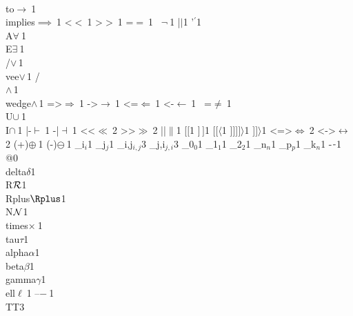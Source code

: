 {{{        {\\to}{{$\to\ $}}1
        {\\implies}{{$\implies\ $}}1
        {<}{{$<\ $}}1
        {>}{{$>\ $}}1
        {=}{{$=\ $}}1
        {~}{{$\neg\ $}}1
        {|}{{$\mid$}}1
        {'}{{$^\prime$}}1
        {\\A}{{$\forall\ $}}1
        {\\E}{{$\exists\ $}}1
        {\\/}{{$\vee\,$}}1
        {\\vee}{{$\vee\,$}}1
        {/\\}{{$\wedge\,$}}1
        {\\wedge}{{$\wedge\,$}}1
        {=>}{{$\Rightarrow\ $}}1
        {->}{{$\rightarrow\ $}}1
        {<=}{{$\Leftarrow\ $}}1
        {<-}{{$\leftarrow\ $}}1
        {~=}{{$\neq\ $}}1
        {\\U}{{$\cup\ $}}1
        {\\I}{{$\cap\ $}}1
        {|-}{{$\vdash\ $}}1
        {-|}{{$\dashv\ $}}1
        {<<}{{$\ll\ $}}2
        {>>}{{$\gg\ $}}2
        {||}{{$\|$}}1
        {[}{{$[$}}1
        {]}{{$\,]$}}1
        {[[}{{$\langle$}}1
        {]]]}{{$]\rangle$}}1
        {]]}{{$\rangle$}}1
        {<=>}{{$\Leftrightarrow\ $}}2
        {<->}{{$\leftrightarrow\ $}}2
        {(+)}{{$\oplus\ $}}1
        {(-)}{{$\ominus\ $}}1
        {_i}{{$_{i}$}}1
        {_j}{{$_{j}$}}1
        {_{i,j}}{{$_{i,j}$}}3
        {_{j,i}}{{$_{j,i}$}}3
        {_0}{{$_0$}}1
        {_1}{{$_1$}}1
        {_2}{{$_2$}}1
        {_n}{{$_n$}}1
        {_p}{{$_p$}}1
        {_k}{{$_n$}}1
        {-}{{$\ms{-}$}}1
        {@}{{}}0
        {\\delta}{{$\delta$}}1
        {\\R}{{${\mathcal R}$}}1
        {\\Rplus}{{$\Rplus$}}1
        {\\N}{{${\mathcal N}$}}1
        {\\times}{{$\times\ $}}1
        {\\tau}{{$\tau$}}1
        {\\alpha}{{$\alpha$}}1
        {\\beta}{{$\beta$}}1
        {\\gamma}{{$\gamma$}}1
        {\\ell}{{$\ell\ $}}1
        {--}{{$-\ $}}1
        {\\TT}{{\hspace{1.5em}}}3
      }

}}
